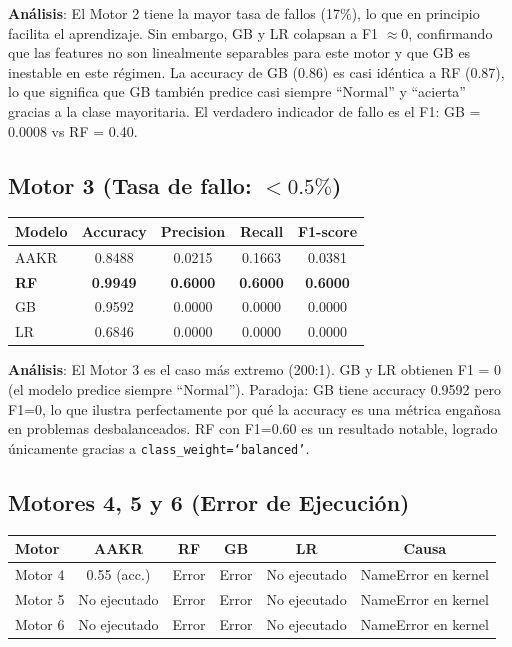 \documentclass[12pt,a4paper]{article}
\begin{document}
\textbf{An\'{a}lisis}: El Motor 2 tiene la mayor tasa de fallos (17\%), lo que en principio
facilita el aprendizaje. Sin embargo, GB y LR colapsan a F1 $\approx 0$, confirmando
que las features no son linealmente separables para este motor y que GB es inestable
en este r\'{e}gimen. La accuracy de GB (0.86) es casi id\'{e}ntica a RF (0.87), lo que
significa que GB tambi\'{e}n predice casi siempre ``Normal'' y ``acierta'' gracias a la
clase mayoritaria. El verdadero indicador de fallo es el F1: GB = 0.0008 vs RF = 0.40.

\subsection{Motor 3 (Tasa de fallo: $< 0.5\%$)}

\begin{center}
\begin{tabular}{lcccc}
\toprule
\textbf{Modelo} & \textbf{Accuracy} & \textbf{Precision} & \textbf{Recall} & \textbf{F1-score} \\
\midrule
AAKR & 0.8488 & 0.0215 & 0.1663 & 0.0381 \\
\textbf{RF}   & \textbf{0.9949} & \textbf{0.6000} & \textbf{0.6000} & \textbf{0.6000} \\
GB   & 0.9592 & 0.0000 & 0.0000 & 0.0000 \\
LR   & 0.6846 & 0.0000 & 0.0000 & 0.0000 \\
\bottomrule
\end{tabular}
\end{center}

\textbf{An\'{a}lisis}: El Motor 3 es el caso m\'{a}s extremo (200:1). GB y LR obtienen F1 = 0
(el modelo predice siempre ``Normal''). Paradoja: GB tiene accuracy 0.9592 pero F1=0,
lo que ilustra perfectamente por qu\'{e} la accuracy es una m\'{e}trica engañosa en problemas
desbalanceados. RF con F1=0.60 es un resultado notable, logrado \'{u}nicamente gracias
a \texttt{class\_weight=`balanced'}.

\subsection{Motores 4, 5 y 6 (Error de Ejecuci\'{o}n)}

\begin{center}
\begin{tabular}{lccccc}
\toprule
\textbf{Motor} & \textbf{AAKR} & \textbf{RF} & \textbf{GB} & \textbf{LR} & \textbf{Causa} \\
\midrule
Motor 4 & 0.55 (acc.) & Error & Error & No ejecutado & NameError en kernel \\
Motor 5 & No ejecutado & Error & Error & No ejecutado & NameError en kernel \\
Motor 6 & No ejecutado & Error & Error & No ejecutado & NameError en kernel \\
\bottomrule
\end{tabular}
\end{center}
\end{document}
